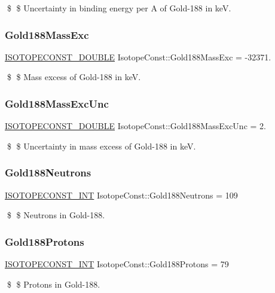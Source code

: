 \$ \$ Uncertainty in binding energy per A of Gold-\/188 in keV. \mbox{\label{group___isotope_const-_gold-_au188_gaa90a5b6811c1ea1c42261daa9d210db9}} 
\subsubsection{\texorpdfstring{Gold188\+Mass\+Exc}{Gold188MassExc}}
{\footnotesize\ttfamily \mbox{\hyperlink{group___isotope_const-_macros_ga8f45a7272ce02c0b4c65c44636ed719a}{I\+S\+O\+T\+O\+P\+E\+C\+O\+N\+S\+T\+\_\+\+D\+O\+U\+B\+LE}} Isotope\+Const\+::\+Gold188\+Mass\+Exc = -\/32371.}

\$ \$ Mass excess of Gold-\/188 in keV. \mbox{\label{group___isotope_const-_gold-_au188_ga77219667c9a7932dea1cd3395b4bdf3b}} 
\subsubsection{\texorpdfstring{Gold188\+Mass\+Exc\+Unc}{Gold188MassExcUnc}}
{\footnotesize\ttfamily \mbox{\hyperlink{group___isotope_const-_macros_ga8f45a7272ce02c0b4c65c44636ed719a}{I\+S\+O\+T\+O\+P\+E\+C\+O\+N\+S\+T\+\_\+\+D\+O\+U\+B\+LE}} Isotope\+Const\+::\+Gold188\+Mass\+Exc\+Unc = 2.}

\$ \$ Uncertainty in mass excess of Gold-\/188 in keV. \mbox{\label{group___isotope_const-_gold-_au188_ga61dbdfc64d4911c0bec4f69177a85f40}} 
\subsubsection{\texorpdfstring{Gold188\+Neutrons}{Gold188Neutrons}}
{\footnotesize\ttfamily \mbox{\hyperlink{group___isotope_const-_macros_ga5f18360b3e99483a35c32d789e62621c}{I\+S\+O\+T\+O\+P\+E\+C\+O\+N\+S\+T\+\_\+\+I\+NT}} Isotope\+Const\+::\+Gold188\+Neutrons = 109}

\$ \$ Neutrons in Gold-\/188. \mbox{\label{group___isotope_const-_gold-_au188_ga6a1aff379a38793dacf7e768268dc685}} 
\subsubsection{\texorpdfstring{Gold188\+Protons}{Gold188Protons}}
{\footnotesize\ttfamily \mbox{\hyperlink{group___isotope_const-_macros_ga5f18360b3e99483a35c32d789e62621c}{I\+S\+O\+T\+O\+P\+E\+C\+O\+N\+S\+T\+\_\+\+I\+NT}} Isotope\+Const\+::\+Gold188\+Protons = 79}

\$ \$ Protons in Gold-\/188. 